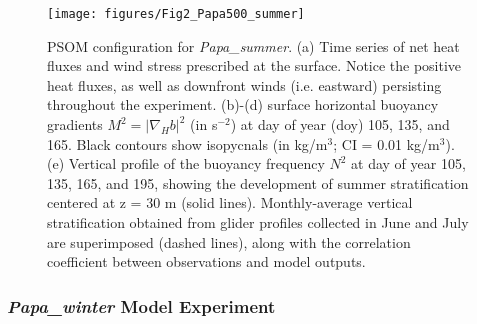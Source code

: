 \documentclass[draft,linenumbers]{agujournal2018}
\begin{document}


\begin{figure}[t]
	\texttt{[image: figures/Fig2\_Papa500\_summer]}
	\caption{PSOM configuration for \textit{Papa\_summer}. (a) Time series of net heat fluxes and wind stress prescribed at the surface. Notice the positive heat fluxes, as well as downfront winds (i.e. eastward) persisting throughout the experiment. (b)-(d) surface horizontal buoyancy gradients $M^2 = |\nabla_Hb|^2$ (in s$^{-2}$) at day of year (doy) 105, 135, and 165. Black contours show isopycnals (in kg/m$^3$; CI = 0.01 kg/m$^3$). (e) Vertical profile of the buoyancy frequency $N^2$ at day of year 105, 135, 165, and 195, showing the development of summer stratification centered at z = 30 m (solid lines). Monthly-average vertical stratification obtained from glider profiles collected in June and July are superimposed (dashed lines), along with the correlation coefficient between observations and model outputs.}
	\label{fig: Papa_summer}
\end{figure} 


\subsubsection{\textit{Papa\_winter} Model Experiment}
\end{document}
